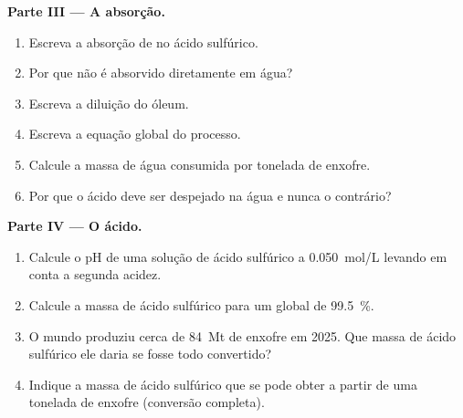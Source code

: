 \begin{problem}
\medskip
\noindent\textbf{Parte III --- A absorção.}
\begin{enumerate}[resume]
  \item Escreva a absorção de  no ácido sulfúrico.
  \item Por que  não é absorvido diretamente em água?
  \item Escreva a diluição do óleum.
  \item Escreva a equação global do processo.
  \item Calcule a massa de água consumida por tonelada de enxofre.
  \item Por que o ácido deve ser despejado na água e nunca o contrário?
\end{enumerate}

\medskip
\noindent\textbf{Parte IV --- O ácido.}
\begin{enumerate}[resume]
  \item Calcule o pH de uma solução de ácido sulfúrico a \qty{0.050}{mol/L}
        levando em conta a segunda acidez.
  \item Calcule a massa de ácido sulfúrico para um  global de
        \qty{99.5}{\percent}.
  \item O mundo produziu cerca de \qty{84}{Mt} de enxofre em 2025. Que
        massa de ácido sulfúrico ele daria se fosse todo convertido?
  \item Indique a massa de ácido sulfúrico que se pode obter a partir de
        uma tonelada de enxofre (conversão completa).
\end{enumerate}
\end{problem}
